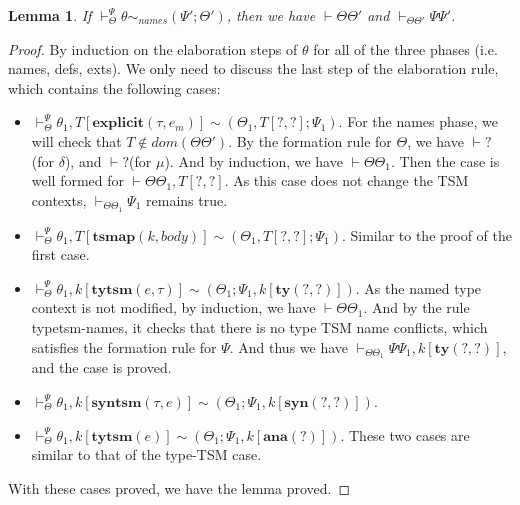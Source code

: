 \documentclass[letterpaper, notitlepage]{article}
\newtheorem{lemma}{Lemma}
\begin{document}
\begin{lemma}
If $\vdash_{\Theta}^{\Psi}\theta\sim_{names}(\Psi';\Theta')$, then we have $\vdash\Theta\Theta'$ and $\vdash_{\Theta\Theta'}\Psi\Psi'$.
\end{lemma}
\begin{proof}
By induction on the elaboration steps of $\theta$ for all of the three phases (i.e. names, defs, exts). We only need to discuss the last step of the elaboration rule, which contains the following cases:
\begin{itemize}
\item $\vdash_{\Theta}^{\Psi}\theta_1,T[\mathbf{explicit}(\tau,e_m)] \sim (\Theta_1,T[?,?];\Psi_1)$. For the names phase, we will check that $T\notin dom(\Theta\Theta')$. By the formation rule for $\Theta$, we have $\vdash ?$ (for $\delta$), and $\vdash ?$(for $\mu$). And by induction, we have $\vdash\Theta\Theta_1$. Then the case is well formed for $\vdash\Theta\Theta_1,T[?,?]$. As this case does not change the TSM contexts, $\vdash_{\Theta\Theta_1}\Psi_1$ remains true.
\item$\vdash_{\Theta}^{\Psi}\theta_1,T[\mathbf{tsmap}(k,body)] \sim (\Theta_1,T[?,?];\Psi_1)$. Similar to the proof of the first case.
\item $\vdash_{\Theta}^{\Psi}\theta_1,k[\mathbf{tytsm}(e,\tau)] \sim (\Theta_1;\Psi_1,k[\mathbf{ty}(?,?)])$. As the named type context is not modified, by induction, we have $\vdash\Theta\Theta_1$. And by the rule typetsm-names, it checks that there is no type TSM name conflicts, which satisfies the formation rule for $\Psi$. And thus we have $\vdash_{\Theta\Theta_1}\Psi\Psi_1,k[\mathbf{ty}(?,?)]$, and the case is proved.
\item $\vdash_{\Theta}^{\Psi}\theta_1,k[\mathbf{syntsm}(\tau,e)] \sim (\Theta_1;\Psi_1,k[\mathbf{syn}(?,?)])$.
\item $\vdash_{\Theta}^{\Psi}\theta_1,k[\mathbf{tytsm}(e)] \sim (\Theta_1;\Psi_1,k[\mathbf{ana}(?)])$. These two cases are similar to that of the type-TSM case.
\end{itemize}
With these cases proved, we have the lemma proved.
\end{proof}
\end{document}
